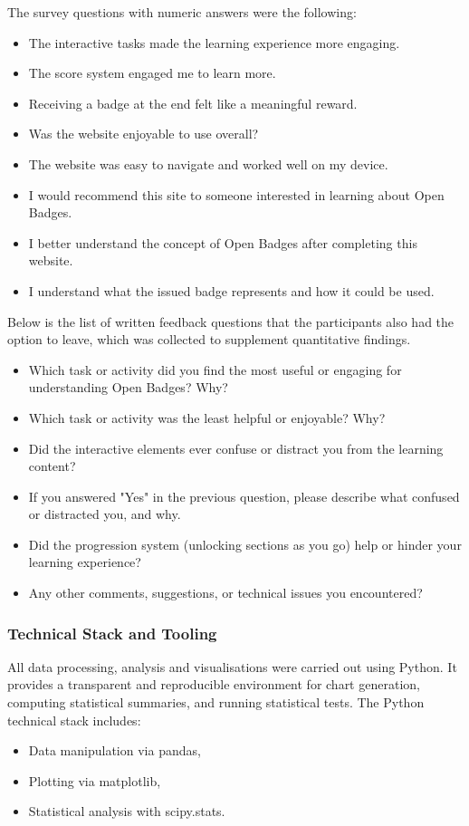 The survey questions with numeric answers were the following:

\begin{itemize}
        \item The interactive tasks made the learning experience more engaging.
        \item The score system engaged me to learn more.
        \item Receiving a badge at the end felt like a meaningful reward.
        \item Was the website enjoyable to use overall?
        \item The website was easy to navigate and worked well on my device.
        \item I would recommend this site to someone interested in learning about Open Badges.
        \item I better understand the concept of Open Badges after completing this website.
        \item I understand what the issued badge represents and how it could be used.
\end{itemize}

Below is the list of written feedback questions that the participants also had the option to leave, which was collected to supplement quantitative findings.
\begin{itemize}
        \item Which task or activity did you find the most useful or engaging for understanding Open Badges? Why?
        \item Which task or activity was the least helpful or enjoyable? Why?
        \item Did the interactive elements ever confuse or distract you from the learning content?
        \item If you answered "Yes" in the previous question, please describe what confused or distracted you, and why.
        \item Did the progression system (unlocking sections as you go) help or hinder your learning experience?
        \item Any other comments, suggestions, or technical issues you encountered?
\end{itemize}

\subsubsection{Technical Stack and Tooling}

All data processing, analysis and visualisations were carried out using Python. 
It provides a transparent and reproducible environment for chart generation, computing statistical summaries, and running statistical tests. 
The Python technical stack includes:
\begin{itemize}
        \item Data manipulation via pandas,
        \item Plotting via matplotlib,
        \item Statistical analysis with scipy.stats.
\end{itemize}

